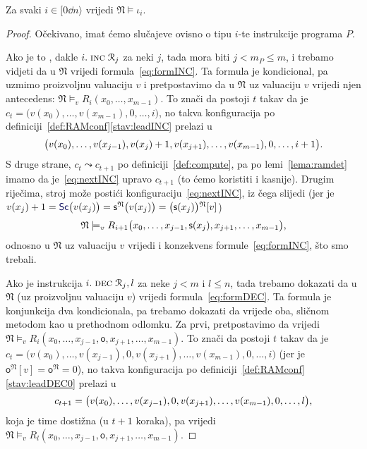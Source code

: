 \begin{lema}[{name=[istinitost instrukcijskih formula u $\mathfrak N$]}]\label{lm:Niotai}
Za svaki $i\in[0\dd n\rangle$ vrijedi $\mathfrak N\models\iota_i$.
\end{lema}
\begin{proof}
Očekivano, imat ćemo slučajeve ovisno o tipu $i$-te instrukcije programa $P$.

Ako je to \inc, dakle $i.\;\textsc{inc}\;\mathcal R_{j}$ za neki $j$, tada mora biti $j<m_P\le m$, i trebamo vidjeti da u $\mathfrak N$ vrijedi formula~\eqref{eq:formINC}. Ta formula je kondicional, pa uzmimo proizvoljnu valuaciju $v$ i pretpostavimo da u $\mathfrak N$ uz valuaciju $v$ vrijedi njen antecedens: $\mathfrak N\models_v R_i(x_0,\dotsc,x_{m-1})$. To znači da postoji $t$ takav da je $c_t=\bigl(v(x_0),\dotsc,v(x_{m-1}),0,\dotsc,i\bigr)$, no takva konfiguracija po definiciji~\ref{def:RAMconf}\eqref{stav:leadINC} prelazi u
\begin{equation}\label{eq:nextINC}
	\bigl(v(x_0),\dotsc,v(x_{j-1}),v(x_j)+1,v(x_{j+1}),\dotsc,v(x_{m-1}),0,\dotsc,i+1\bigr)\text.
\end{equation}
	S druge strane, $c_t\leadsto c_{t+1}$ po definiciji~\ref{def:compute}, pa po lemi~\ref{lema:ramdet} imamo da je~\eqref{eq:nextINC} upravo $c_{t+1}$ (to ćemo koristiti i kasnije). Drugim riječima, stroj može postići konfiguraciju~\eqref{eq:nextINC}, iz čega slijedi (jer je $v(x_j)+1=\f{Sc}\bigl(v(x_j)\bigr)=\mathsf s^{\mathfrak N}\bigl(v(x_j)\bigr)=\bigl(\mathsf s(x_j)\bigr){}^{\mathfrak N}[v]$)
\begin{equation}
    \mathfrak N\models_v R_{i+1}\bigl(x_0,\dotsc,x_{j-1},\mathsf s(x_j),x_{j+1},\dotsc,x_{m-1}\bigr)\text,
\end{equation}
odnosno u $\mathfrak N$ uz valuaciju $v$ vrijedi i konzekvens formule~\eqref{eq:formINC}, što smo trebali.

	Ako je instrukcija $i.\;\textsc{dec}\;\mathcal R_{j},l$ za neke $j<m$ i $l\le n$, tada trebamo dokazati da u $\mathfrak N$ (uz proizvoljnu valuaciju $v$) vrijedi formula~\eqref{eq:formDEC}. Ta formula je konjunkcija dva kondicionala, pa trebamo dokazati da vrijede oba, sličnom metodom kao u prethodnom odlomku. Za prvi, pretpostavimo da vrijedi $\mathfrak N\models_v R_i(x_0,\dotsc,x_{j-1},\mathsf o,x_{j+1},\dotsc,x_{m-1})$. To znači da postoji $t$ takav da je $c_t=\bigl(v(x_0),\dotsc,v(x_{j-1}),0,v(x_{j+1}),\dotsc,v(x_{m-1}),0,\dotsc,i\bigr)$ (jer je $\mathsf o^{\mathfrak N}[v]=\mathsf o^{\mathfrak N}=0$), no takva konfiguracija po definiciji~\ref{def:RAMconf}\eqref{stav:leadDEC0} prelazi u
\begin{equation}
    c_{t+1}=\bigl(v(x_0),\dotsc,v(x_{j-1}),0,v(x_{j+1}),\dotsc,v(x_{m-1}),0,\dotsc,l\bigr)\text,
\end{equation}
koja je time dostižna (u $t+1$ koraka), pa vrijedi $\mathfrak N\models_v R_l(x_0,\dotsc,x_{j-1},\mathsf o,x_{j+1},\dotsc,x_{m-1})$.


\end{proof}
